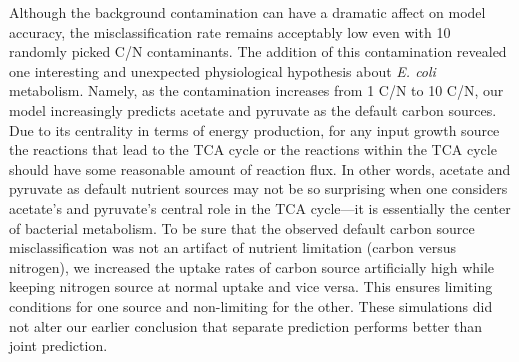 \documentclass[12pt]{article}
\begin{document}
Although the background contamination can have a dramatic affect on model accuracy, the misclassification rate remains acceptably low even with 10 randomly picked C/N contaminants. The addition of this contamination revealed one interesting and unexpected physiological hypothesis about \emph{E. coli} metabolism. Namely, as the contamination increases from 1 C/N to 10 C/N, our model increasingly predicts acetate and pyruvate as the default carbon sources. Due to its centrality in terms of energy production, for any input growth source the reactions that lead to the TCA cycle or the reactions within the TCA cycle should have some reasonable amount of reaction flux. In other words, acetate and pyruvate as default nutrient sources may not be so surprising when one considers acetate's and pyruvate's central role in the TCA cycle---it is essentially the center of bacterial metabolism. To be sure that the observed default carbon source misclassification was not an artifact of nutrient limitation (carbon versus nitrogen), we increased the uptake rates of carbon source artificially high while keeping nitrogen source at normal uptake and vice versa. This ensures limiting conditions for one source and non-limiting for the other. These simulations did not alter our earlier conclusion that separate prediction performs better than joint prediction.


\end{document}
